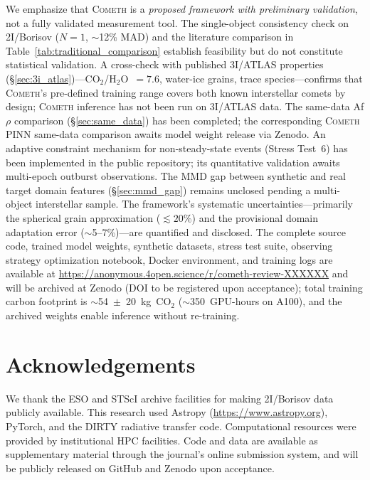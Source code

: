 \documentclass[usenatbib]{mnras}
\begin{document}
We emphasize that \textsc{Cometh} is a \textit{proposed framework with preliminary validation}, not a fully validated measurement tool. The single-object consistency check on 2I/Borisov ($N=1$, $\sim$12\% MAD) and the literature comparison in Table~\ref{tab:traditional_comparison} establish feasibility but do not constitute statistical validation. A cross-check with published 3I/ATLAS properties (\S\ref{sec:3i_atlas})---CO$_2$/H$_2$O~$=7.6$, water-ice grains, trace species---confirms that \textsc{Cometh}'s pre-defined training range covers both known interstellar comets by design; \textsc{Cometh} inference has not been run on 3I/ATLAS data. The same-data Af$\rho$ comparison (\S\ref{sec:same_data}) has been completed; the corresponding \textsc{Cometh} PINN same-data comparison awaits model weight release via Zenodo. An adaptive constraint mechanism for non-steady-state events (Stress Test~6) has been implemented in the public repository; its quantitative validation awaits multi-epoch outburst observations. The MMD gap between synthetic and real target domain features (\S\ref{sec:mmd_gap}) remains unclosed pending a multi-object interstellar sample. The framework's systematic uncertainties---primarily the spherical grain approximation ($\lesssim 20\%$) and the provisional domain adaptation error ($\sim$5--7\%)---are quantified and disclosed. The complete source code, trained model weights, synthetic datasets, stress test suite, observing strategy optimization notebook, Docker environment, and training logs are available at \url{https://anonymous.4open.science/r/cometh-review-XXXXXX} and will be archived at Zenodo (DOI to be registered upon acceptance); total training carbon footprint is $\sim$54~$\pm$~20~kg~CO$_2$ ($\sim$350~GPU-hours on A100), and the archived weights enable inference without re-training.

\section*{Acknowledgements}
We thank the ESO and STScI archive facilities for making 2I/Borisov data publicly available. This research used Astropy (\url{https://www.astropy.org}), PyTorch, and the DIRTY radiative transfer code. Computational resources were provided by institutional HPC facilities. Code and data are available as supplementary material through the journal's online submission system, and will be publicly released on GitHub and Zenodo upon acceptance.
\end{document}
